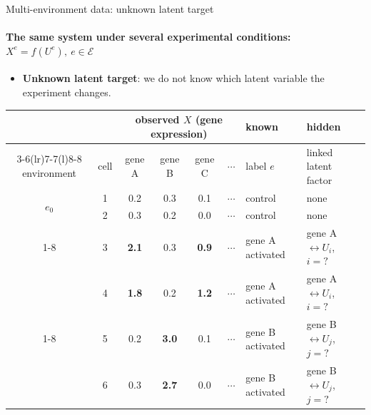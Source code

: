\documentclass[11pt,aspectratio=169]{beamer}
\newcommand{\red}[1]{\textcolor{ETHRed}{#1}}
\begin{document}
\begin{frame}{Multi-environment data: unknown latent target}
	\framesubtitle{The same system under several experimental conditions: $X^e = f(U^e),\ e \in \mathcal{E}$}
	\begin{itemize}
		\item \textbf{Unknown latent target}: we do not know which latent variable the experiment changes.
	\end{itemize}
	\medskip
	\begin{center}
		{\scriptsize
		\renewcommand{\arraystretch}{1.3}
		\begin{tabular}{@{}c c cccc l l@{}}
			\toprule
			& & \multicolumn{4}{c}{\textbf{observed} $X$ (gene expression)} & \textbf{known} & \textbf{hidden} \\
			\cmidrule(lr){3-6}\cmidrule(lr){7-7}\cmidrule(l){8-8}
			environment & cell & gene A & gene B & gene C & $\cdots$ & label $e$ & linked latent factor \\
			\midrule
			\multirow{2}{*}{$e_0$} & 1 & 0.2 & 0.3 & 0.1 & $\cdots$ & control & none \\
			& 2 & 0.3 & 0.2 & 0.0 & $\cdots$ & control & none \\
			\cmidrule(l){1-8}
			\multirow{2}{*}{\red{$e_1$}} & 3 & \red{\textbf{2.1}} & 0.3 & \red{\textbf{0.9}} & $\cdots$ & gene A activated & \red{gene A $\leftrightarrow U_i$, \ $i = {?}$} \\
			& 4 & \red{\textbf{1.8}} & 0.2 & \red{\textbf{1.2}} & $\cdots$ & gene A activated & \red{gene A $\leftrightarrow U_i$, \ $i = {?}$} \\
			\cmidrule(l){1-8}
			\multirow{2}{*}{\red{$e_2$}} & 5 & 0.2 & \red{\textbf{3.0}} & 0.1 & $\cdots$ & gene B activated & \red{gene B $\leftrightarrow U_j$, \ $j = {?}$} \\
			& 6 & 0.3 & \red{\textbf{2.7}} & 0.0 & $\cdots$ & gene B activated & \red{gene B $\leftrightarrow U_j$, \ $j = {?}$} \\
			\bottomrule
		\end{tabular}}
	\end{center}
\end{frame}
\end{document}

